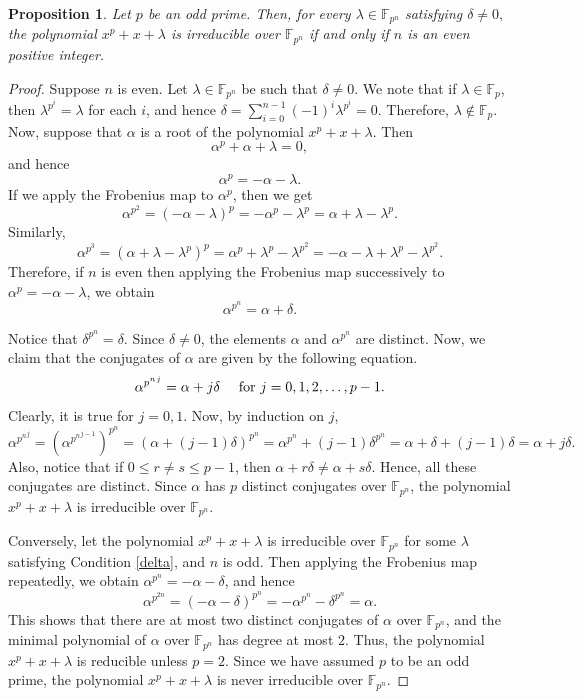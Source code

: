 \documentclass[preprint,12pt]{elsarticle}
\newtheorem{prop}{Proposition}[section]
\begin{document}
        \begin{prop}\label{P4.1}
            Let $p$ be an odd prime. Then, for every $\lambda\in\mathbb{F}_{p^n}$ satisfying
            $\delta\neq 0,$ the polynomial $x^p+x+\lambda$ is irreducible over $\mathbb{F}_{p^n}$ if and only if $n$ is an even positive integer.
        \end{prop}
        \begin{proof}
            
             Suppose $n$ is even. Let $\lambda\in\mathbb{F}_{p^n}$ be such that $\delta\neq 0$. We note that if $\lambda\in\mathbb{F}_p$, then $\lambda^{p^i}=\lambda$ for each $i$, and hence $\delta=\sum_{i=0}^{n-1}(-1)^i\lambda^{p^i}=0$. Therefore, $\lambda\not\in\mathbb{F}_p$. Now, suppose that $\alpha$ is a root of the polynomial $x^p+x+\lambda$. Then
            $$\alpha^p+\alpha+\lambda=0,$$ and hence
            $$\alpha^p=-\alpha-\lambda.$$ 
            If we apply the Frobenius map to $\alpha^p$, then we get 
            $$\alpha^{p^2}=(-\alpha-\lambda)^p=-\alpha^p-\lambda^p=\alpha+\lambda-\lambda^p.$$ 
            Similarly, $$\alpha^{p^3}=(\alpha+\lambda-\lambda^p)^p=\alpha^p+\lambda^p-\lambda^{p^2}=-\alpha-\lambda+\lambda^p-\lambda^{p^2}.$$ 
            Therefore, if $n$ is even then applying the Frobenius map successively to $\alpha^p=-\alpha-\lambda$, we obtain $$\alpha^{p^n}=\alpha+\delta.$$ 
           
            Notice that $\delta^{p^n}=\delta$. Since $\delta\neq 0$, the elements $\alpha$ and $\alpha^{p^n}$ are distinct. Now, we claim that the conjugates of $\alpha$ are given by the following equation. 
            $$\alpha^{{p^n}^j}=\alpha+j\delta \text{  \quad for } j=0,1,2,\ldots,p-1.$$
            Clearly, it is true for $j=0,1$. Now, by induction on $j$, 
            $$\alpha^{{p^n}^j}=(\alpha^{{p^n}^{j-1}})^{p^n}=(\alpha+(j-1)\delta)^{{p^n}}=\alpha^{p^n}+(j-1)\delta^{p^n}=\alpha+\delta+(j-1)\delta=\alpha+j\delta.$$
            Also, notice that if $0\leq r\neq s\leq p-1$, then $\alpha+r\delta\neq \alpha+s\delta$. Hence, all these conjugates are distinct. Since $\alpha$ has $p$ distinct conjugates over $\mathbb{F}_{p^n}$, the polynomial $x^p+x+\lambda$ is irreducible over $\mathbb{F}_{p^n}$.

            Conversely, let the polynomial $x^p+x+\lambda$ is irreducible over $\mathbb{F}_{p^n}$ for some $\lambda$ satisfying Condition \eqref{delta}, and $n$ is odd. Then applying the Frobenius map repeatedly, we obtain $\alpha^{{p^{n}}}=-\alpha-\delta$, and hence $$\alpha^{{p^{2n}}}=(-\alpha-\delta)^{p^n}=-\alpha^{p^n}-\delta^{p^n}=\alpha.$$ 
            This shows that there are at most two distinct conjugates of $\alpha$ over $\mathbb{F}_{p^n}$, and the minimal polynomial of $\alpha$ over $\mathbb{F}_{p^n}$ has degree at most $2$. Thus, the polynomial $x^p+x+\lambda$ is reducible unless $p=2$. Since we have assumed $p$ to be an odd prime, the polynomial $x^p+x+\lambda$ is never irreducible over $\mathbb{F}_{p^n}$.
        \end{proof}
\end{document}
